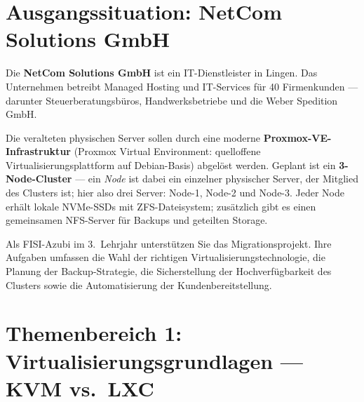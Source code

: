 \documentclass[a4paper,10pt,addpoints]{exam}
\begin{document}
\section*{Ausgangssituation: NetCom Solutions GmbH}

Die \textbf{NetCom Solutions GmbH} ist ein IT-Dienstleister in Lingen.
Das Unternehmen betreibt Managed Hosting und IT-Services für 40 Firmenkunden ---
darunter Steuerberatungsbüros, Handwerksbetriebe und die Weber Spedition GmbH.

Die veralteten physischen Server sollen durch eine moderne
\textbf{Proxmox-VE-Infrastruktur} (Proxmox Virtual Environment: quelloffene
Virtualisierungsplattform auf Debian-Basis) abgelöst werden.
Geplant ist ein \textbf{3-Node-Cluster} --- ein \emph{Node} ist dabei ein einzelner
physischer Server, der Mitglied des Clusters ist; hier also drei Server:
Node-1, Node-2 und Node-3.
Jeder Node erhält lokale NVMe-SSDs mit ZFS-Dateisystem; zusätzlich gibt es einen
gemeinsamen NFS-Server für Backups und geteilten Storage.

Als FISI-Azubi im 3.\ Lehrjahr unterstützen Sie das Migrationsprojekt.
Ihre Aufgaben umfassen die Wahl der richtigen Virtualisierungstechnologie,
die Planung der Backup-Strategie, die Sicherstellung der Hochverfügbarkeit
des Clusters sowie die Automatisierung der Kundenbereitstellung.

\section*{Themenbereich 1: Virtualisierungsgrundlagen --- KVM vs.\ LXC}
\end{document}
